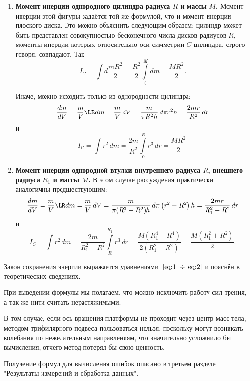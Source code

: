 \begin{Enumerate}
\begin{enumerate}
		\item \textbf{Момент инерции однородного цилиндра радиуса $R$ и массы $M$.} Момент инерции этой фигуры задаётся той же формулой, что и момент инерции плоского диска. Это можно объяснить следующим образом: цилиндр может быть представлен совокупностью бесконечного числа дисков радиусов $R$, моменты инерции которых относительно оси симметрии $C$ цилиндра, строго говоря, совпадают. Так
		\[
		I_C=\int d\frac{mR^2}{2}=\frac{R^2}{2}\int\limits_0^M dm=\frac{MR^2}{2}.
		\]
		
		Иначе, можно исходить только из однородности цилиндра:
		\[
		\frac{dm}{dV}=\frac{m}{V}\LR dm=\frac{m}{V}\,dV=\frac{m}{\pi R^2h}\,d\pi r^2h=\frac{2mr}{R^2}\,dr
		\]
		и
		\[
		I_C=\int r^2\,dm=\frac{2m}{R^2}\int\limits_0^R r^3\,dr=\frac{MR^2}{2}.
		\]
		
		\item \textbf{Момент инерции однородной втулки внутреннего радиуса $R$, внешнего радиуса $R_1$ и массы $M$.} В этом случае рассуждения практически аналогичны предшествующим:
		\[
		\frac{dm}{dV}=\frac{m}{V}\LR dm=\frac{m}{V}\,dV=\frac{m}{\pi (R_1^2-R^2)h}\,d\pi \left(r^2-R^2\right)h=\frac{2mr}{R_1^2-R^2}\,dr
		\]
		и
		\[
		I_C=\int r^2\,dm=\frac{2m}{R_1^2-R^2}\int\limits_R^{R_1} r^3\,dr=\frac{M\left(R_1^4-R^4\right)}{2\left(R_1^2-R^2\right)}=\frac{M\left(R_1^2+R^2\right)}{2}.
		\]
	\end{enumerate}
	
	\item Закон сохранения энергии выражается уравнениями~$\eqref{eq:1}\div\eqref{eq:2}$ и пояснён в теоретических сведениях.
	
	\item При выведении формулы мы полагаем, что можно исключить работу сил трения, а так же нити считать нерастяжимыми.
	
	\item В том случае, если ось вращения платформы не проходит через центр масс тела, методом трифилярного подвеса пользоваться нельзя, поскольку могут возникать колебания по нежелательным направлениям, что значительно усложнило бы вычисления, отчего метод потерял бы свою ценность.
	
	\item Получение формул для вычисления ошибок описано в третьем разделе "Результаты измерений и обработка данных"{}.
\end{Enumerate}